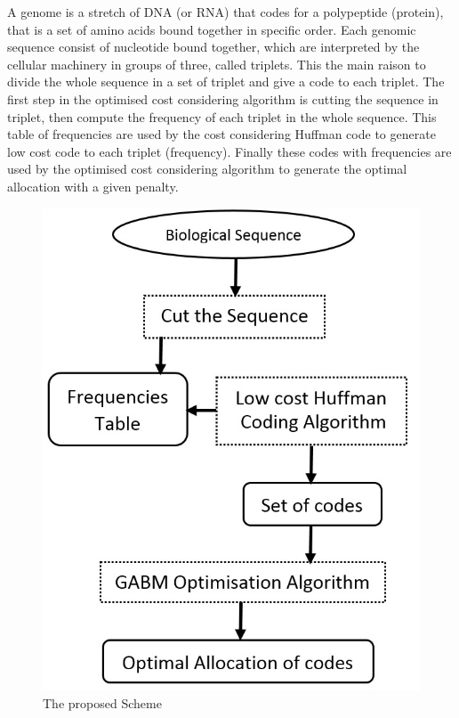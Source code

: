 \documentclass[preprint,12pt]{elsarticle}
\begin{document}
A genome is a stretch of DNA (or RNA) that codes for a polypeptide (protein), that is a set of amino acids bound together in specific order. Each genomic sequence consist of nucleotide bound together, which are interpreted by the cellular machinery in groups of three, called triplets. This the main raison to divide the whole sequence in a set of triplet and give a code to each triplet. The first step in the optimised cost considering algorithm is cutting the sequence in triplet, then compute the frequency of each triplet in the whole sequence. This table of frequencies are used by the cost considering Huffman code to generate low cost code to each triplet (frequency). Finally these codes with frequencies are used by the optimised cost considering algorithm to generate the optimal allocation with a given  penalty.

\begin{figure}[thpb]
\begin{center}
\includegraphics[scale=0.5]{Images/Drawing3.jpg}
\caption{The proposed Scheme}
\end{center}
\label{Fig1}
\end{figure}
\end{document}
